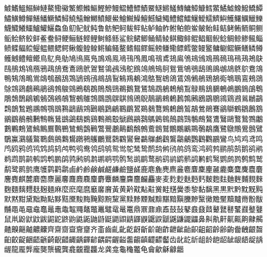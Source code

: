 鰬鰭鰮鰯鰰鰱鰲鰳鰴鰵鰶鰷鰸鰹鰺鰻鰼鰽鰾鰿鱀鱁鱂鱃鱄鱅鱆鱇鱈鱉鱊鱋鱌鱍鱎鱏鱐鱑鱒鱓鱔鱕鱖鱗鱘鱙鱚鱛鱜鱝鱞鱟鱠鱡鱢鱣鱤鱥鱦鱧鱨鱩鱪鱫鱬鱭鱮鱯鱰鱱鱲鱳鱴鱵鱶鱷鱸鱹鱺鱻鱼鱽鱾鱿鲀鲁鲂鲃鲄鲅鲆鲇鲈鲉鲊鲋鲌鲍鲎鲏鲐鲑鲒鲓鲔鲕鲖鲗鲘鲙鲚鲛鲜鲝鲞鲟鲠鲡鲢鲣鲤鲥鲦鲧鲨鲩鲪鲫鲬鲭鲮鲯鲰鲱鲲鲳鲴鲵鲶鲷鲸鲹鲺鲻鲼鲽鲾鲿鳀鳁鳂鳃鳄鳅鳆鳇鳈鳉鳊鳋鳌鳍鳎鳏鳐鳑鳒鳓鳔鳕鳖鳗鳘鳙鳚鳛鳜鳝鳞鳟鳠鳡鳢鳣鳤鳥鳦鳧鳨鳩鳪鳫鳬鳭鳮鳯鳰鳱鳲鳳鳴鳵鳶鳷鳸鳹鳺鳻鳼鳽鳾鳿鴀鴁鴂鴃鴄鴅鴆鴇鴈鴉鴊鴋鴌鴍鴎鴏鴐鴑鴒鴓鴔鴕鴖鴗鴘鴙鴚鴛鴜鴝鴞鴟鴠鴡鴢鴣鴤鴥鴦鴧鴨鴩鴪鴫鴬鴭鴮鴯鴰鴱鴲鴳鴴鴵鴶鴷鴸鴹鴺鴻鴼鴽鴾鴿鵀鵁鵂鵃鵄鵅鵆鵇鵈鵉鵊鵋鵌鵍鵎鵏鵐鵑鵒鵓鵔鵕鵖鵗鵘鵙鵚鵛鵜鵝鵞鵟鵠鵡鵢鵣鵤鵥鵦鵧鵨鵩鵪鵫鵬鵭鵮鵯鵰鵱鵲鵳鵴鵵鵶鵷鵸鵹鵺鵻鵼鵽鵾鵿鶀鶁鶂鶃鶄鶅鶆鶇鶈鶉鶊鶋鶌鶍鶎鶏鶐鶑鶒鶓鶔鶕鶖鶗鶘鶙鶚鶛鶜鶝鶞鶟鶠鶡鶢鶣鶤鶥鶦鶧鶨鶩鶪鶫鶬鶭鶮鶯鶰鶱鶲鶳鶴鶵鶶鶷鶸鶹鶺鶻鶼鶽鶾鶿鷀鷁鷂鷃鷄鷅鷆鷇鷈鷉鷊鷋鷌鷍鷎鷏鷐鷑鷒鷓鷔鷕鷖鷗鷘鷙鷚鷛鷜鷝鷞鷟鷠鷡鷢鷣鷤鷥鷦鷧鷨鷩鷪鷫鷬鷭鷮鷯鷰鷱鷲鷳鷴鷵鷶鷷鷸鷹鷺鷻鷼鷽鷾鷿鸀鸁鸂鸃鸄鸅鸆鸇鸈鸉鸊鸋鸌鸍鸎鸏鸐鸑鸒鸓鸔鸕鸖鸗鸘鸙鸚鸛鸜鸝鸞鸟鸠鸡鸢鸣鸤鸥鸦鸧鸨鸩鸪鸫鸬鸭鸮鸯鸰鸱鸲鸳鸴鸵鸶鸷鸸鸹鸺鸻鸼鸽鸾鸿鹀鹁鹂鹃鹄鹅鹆鹇鹈鹉鹊鹋鹌鹍鹎鹏鹐鹑鹒鹓鹔鹕鹖鹗鹘鹙鹚鹛鹜鹝鹞鹟鹠鹡鹢鹣鹤鹥鹦鹧鹨鹩鹪鹫鹬鹭鹮鹯鹰鹱鹲鹳鹴鹵鹶鹷鹸鹹鹺鹻鹼鹽鹾鹿麀麁麂麃麄麅麆麇麈麉麊麋麌麍麎麏麐麑麒麓麔麕麖麗麘麙麚麛麜麝麞麟麠麡麢麣麤麥麦麧麨麩麪麫麬麭麮麯麰麱麲麳麴麵麶麷麸麹麺麻麼麽麾麿黀黁黂黃黄黅黆黇黈黉黊黋黌黍黎黏黐黑黒黓黔黕黖黗默黙黚黛黜黝點黟黠黡黢黣黤黥黦黧黨黩黪黫黬黭黮黯黰黱黲黳黴黵黶黷黸黹黺黻黼黽黾黿鼀鼁鼂鼃鼄鼅鼆鼇鼈鼉鼊鼋鼌鼍鼎鼏鼐鼑鼒鼓鼔鼕鼖鼗鼘鼙鼚鼛鼜鼝鼞鼟鼠鼡鼢鼣鼤鼥鼦鼧鼨鼩鼪鼫鼬鼭鼮鼯鼰鼱鼲鼳鼴鼵鼶鼷鼸鼹鼺鼻鼼鼽鼾鼿齀齁齂齃齄齅齆齇齈齉齊齋齌齍齎齏齐齑齒齓齔齕齖齗齘齙齚齛齜齝齞齟齠齡齢齣齤齥齦齧齨齩齪齫齬齭齮齯齰齱齲齳齴齵齶齷齸齹齺齻齼齽齾齿龀龁龂龃龄龅龆龇龈龉龊龋龌龍龎龏龐龑龒龓龔龕龖龗龘龙龚龛龜龝龞龟龠龡龢龣龤